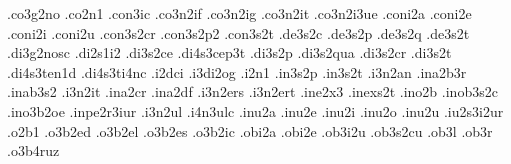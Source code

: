 {.co3g2no                          %
.co2n1
.con3ic                           %
.co3n2if .co3n2ig .co3n2it .co3n2i3ue %
.coni2a .coni2e .coni2i .coni2u   %
.con3s2cr                         %
.con3s2p2                         %
.con3s2t                          %
.de3s2c                           %
.de3s2p                           %
.de3s2q                           %
.de3s2t                           %
.di3g2nosc                        %
.di2s1i2                          %
.di3s2ce                          %
.di4s3cep3t                       %
.di3s2p                           %
.di3s2qua                         %
.di3s2cr                          %
.di3s2t                           %
.di4s3ten1d                       %
.di4s3ti4nc                       %
.i2dci                            %
.i3di2og                          %
.i2n1 .in3s2p .in3s2t             %
.i3n2an .ina2b3r .inab3s2 .i3n2it %
.ina2cr .ina2df                   %
.i3n2ers .i3n2ert                 %
.ine2x3                           %
.inexs2t                          %
.ino2b                            %
.inob3s2c                         %
.ino3b2oe                         %
.inpe2r3iur                       %
.i3n2ul                           %
.i4n3ulc                          %
.inu2a .inu2e .inu2i .inu2o .inu2u %
.iu2s3i2ur                        %
.o2b1
.o3b2ed                           %
.o3b2el                           %
.o3b2es                           %
.o3b2ic                           %
.obi2a .obi2e .ob3i2u             %
.ob3s2cu                          %
.ob3l                             %
.ob3r                             %
.o3b4ruz                          %
}

